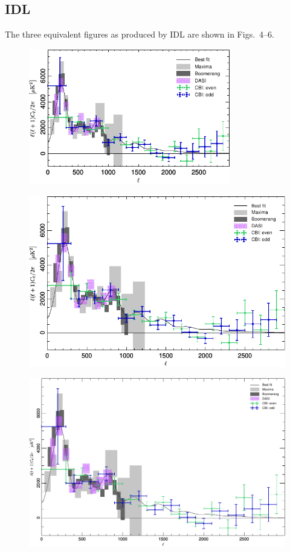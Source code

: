 \documentclass[traditabstract]{aa}
\begin{document}
\clearpage






\subsection{IDL}

The three equivalent figures as produced by IDL are shown in Figs.~4--6.

\begin{figure}[h]
\includegraphics[width=8.8cm]{PlanckFig_lineplot_IDL_88mm.pdf}
\caption{\fcaption} 
\end{figure}

\begin{figure}
\sidecaption
\includegraphics[width=12cm]{PlanckFig_lineplot_IDL_120mm.pdf}
\caption{\fcaption}
\end{figure}

\begin{figure}
\includegraphics[width=18cm]{PlanckFig_lineplot_IDL_180mm.pdf}
\caption{\fcaption}
\end{figure}
\end{document}
